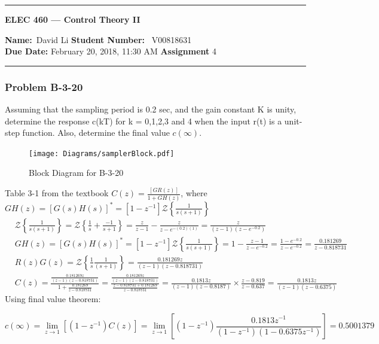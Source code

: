 
\begin{center}
	\hrule
	\vspace{.4cm}
	{\textbf { \large ELEC 460 --- Control Theory II}}
\end{center}
{\textbf{Name:}\ David Li \hspace{\fill} \textbf{Student Number:} \ V00818631}  \\
{\textbf{Due Date:} February 20, 2018, 11:30 AM \hspace{\fill} \textbf{Assignment}  4}\\
\hrule

\subsubsection*{Problem B-3-20}
Assuming that the sampling period is 0.2 sec, and the gain constant K is unity, determine the response c(kT) for k = 0,1,2,3 and 4 when the input r(t) is a unit-step function. Also, determine the final value $c(\infty)$.
\begin{figure}[H]
	\centering
	\texttt{[image: Diagrams/samplerBlock.pdf]}
	\caption{Block Diagram for B-3-20}
	\label{fig:samplerblock}
\end{figure}

Table 3-1 from the textbook %
 $C(z)=\frac{[GR(z)]}{1+GH(z)}$, where $GH(z) = \left[G(s)H(s)\right]^\ast=[1-z^{-1}] \mathcal{Z} \left\{\frac{1}{s(s+1)}\right\}$
\begin{align*}
&  \mathcal{Z} \left\{\frac{1}{s(s+1)}\right\} = \mathcal{Z} \left\{\frac{1}{s}+\frac{-1}{s+1}\right\} = \frac{z}{z-1}-\frac{z}{z-e^{-(0.2)(1)}}=\frac{z}{(z-1)(z-e^{-0.2})} \\
& GH(z) = \left[G(s)H(s)\right]^\ast=[1-z^{-1}] \mathcal{Z} \left\{\frac{1}{s(s+1)}\right\} 
= 1-\frac{z-1}{z-e^{-0.2}}=\frac{1-e^{-0.2}}{z-e^{-0.2}}=\frac{0.181269}{z-0.818731} \\
& R(z)G(z)= \mathcal{Z} \left\{\frac{1}{s}\frac{1}{(s+1)}\right\} = \frac{0.181269z}{(z-1)(z-0.818731)} \\
& C(z) =\frac{\frac{0.181269z}{(z-1)(z-0.818731)}}{1+\frac{0.181269}{z-0.818731}}= \frac{\frac{0.181269z}{(z-1)(z-0.818731)}}{\frac{z-0.818731+0.181269}{z-0.818731}}= \frac{0.1813z}{(z-1)(z-0.8187)} \times \frac{z-0.819}{z-0.637}=\frac{0.1813z}{(z-1)(z-0.6375)} 
\end{align*}
Using final value theorem:

\[ c(\infty)=\lim\limits_{z\rightarrow 1} \left[ \left(1-z^{-1}\right)C(z)\right]=\lim\limits_{z\rightarrow 1} \left[ \left(1-z^{-1}\right)\frac{0.1813z^{-1}}{(1-z^{-1})(1-0.6375z^{-1})} \right]=0.5001379 \]
